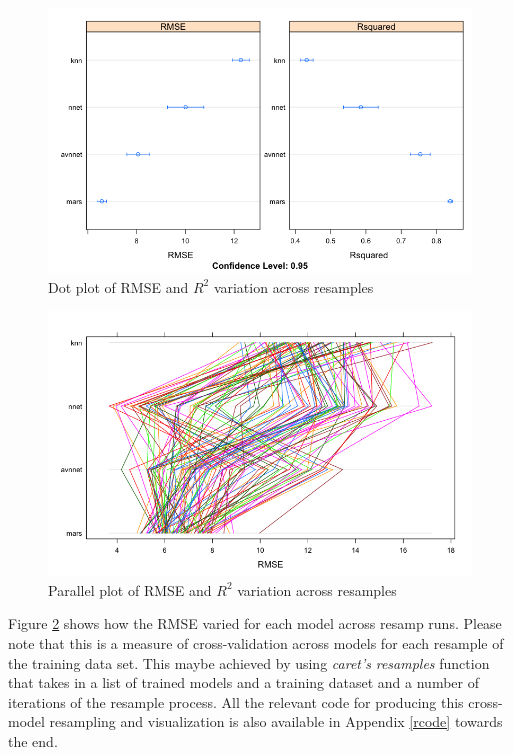 \documentclass[letterpaper,12pt,titlepage,oneside,final]{report}
\begin{document}
            \begin{figure}[!h]
                \centering
                \includegraphics[width=\textwidth]{resamp_dotplot}
                \caption{Dot plot of RMSE and $R^2$ variation across resamples}
                \label{resamp_dotplot}
            \end{figure}

            \begin{figure}[!h]
                \centering
                \includegraphics[width=\textwidth]{resamp_parallelplot}
                \caption{Parallel plot of RMSE and $R^2$ variation across resamples}
                \label{resamp_parallelplot}
            \end{figure}
            Figure \ref{resamp_parallelplot} shows how the RMSE varied for each model across resamp runs. Please note that this is a measure of cross-validation across models for each resample of the training data set. This maybe achieved by using \textit{caret's} \textit{resamples} function that takes in a list of trained models and a training dataset and a number of iterations of the resample process. All the relevant code for producing this cross-model resampling and visualization is also available in Appendix \ref{rcode} towards the end.
\end{document}

